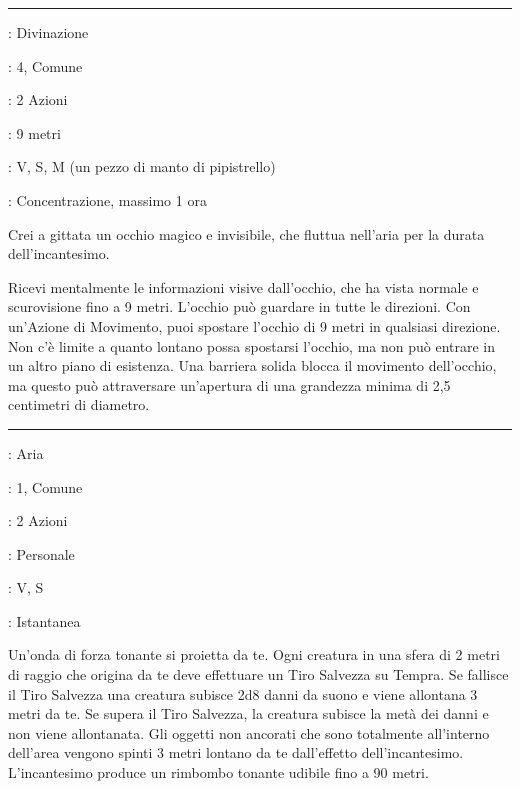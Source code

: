 \begin{multicols}{2}
\smallskip\noindent\rule{\linewidth}{2pt} \hypertarget{Occhio Arcano}{}\medskip{}
\noindent
\begin{description}[noitemsep, topsep=0pt, parsep=0pt, partopsep=0pt, leftmargin=0cm, labelwidth=2.8cm]
	\item[\textbf{Lista di Magia}]: Divinazione
	\item[\textbf{Livello}]: 4, Comune
	\item[\textbf{T. di Lancio}]: 2 Azioni
	\item[\textbf{Gittata}]: 9 metri
	\item[\textbf{Componenti}]: V, S, M (un pezzo di manto di pipistrello)
	\item[\textbf{Durata}]: Concentrazione, massimo 1 ora
\end{description}

Crei a gittata un occhio magico e invisibile, che fluttua nell'aria per la durata dell'incantesimo.

Ricevi mentalmente le informazioni visive dall'occhio, che ha vista normale e scurovisione fino a 9 metri. L'occhio può guardare in tutte le direzioni. Con un'Azione di Movimento, puoi spostare l'occhio di 9 metri in qualsiasi direzione. Non c'è limite a quanto lontano possa spostarsi l'occhio, ma non può entrare in un altro piano di esistenza. Una barriera solida blocca il movimento dell'occhio, ma questo può attraversare un'apertura di una grandezza minima di 2,5 centimetri di diametro.

\smallskip\noindent\rule{\linewidth}{2pt} \hypertarget{Onda Tonante}{}\medskip{}
\noindent
\begin{description}[noitemsep, topsep=0pt, parsep=0pt, partopsep=0pt, leftmargin=0cm, labelwidth=2.8cm]
	\item[\textbf{Lista di Magia}]: Aria
	\item[\textbf{Livello}]: 1, Comune
	\item[\textbf{T. di Lancio}]: 2 Azioni
	\item[\textbf{Gittata}]: Personale
	\item[\textbf{Componenti}]: V, S
	\item[\textbf{Durata}]: Istantanea
\end{description}

Un'onda di forza tonante si proietta da te. Ogni creatura in una sfera di 2 metri di raggio che origina da te deve effettuare un Tiro Salvezza su Tempra. Se fallisce il Tiro Salvezza una creatura subisce 2d8 danni da suono e viene allontana 3 metri da te. Se supera il Tiro Salvezza, la creatura subisce la metà dei danni e non viene allontanata. Gli oggetti non ancorati che sono totalmente all'interno dell'area vengono spinti 3 metri lontano da te dall'effetto dell'incantesimo. L'incantesimo produce un rimbombo tonante udibile fino a 90 metri.


\end{multicols}
